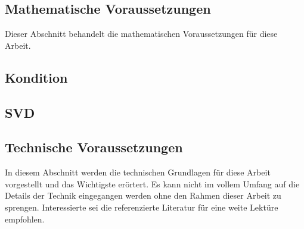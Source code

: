 \subsection[mathematisches]{Mathematische Voraussetzungen}
%
Dieser Abschnitt behandelt die mathematischen Voraussetzungen für diese Arbeit.
%
\subsection{Kondition}

%
\subsection{SVD}

%
\subsection[technisches]{Technische Voraussetzungen}
%
In diesem Abschnitt werden die technischen Grundlagen für diese Arbeit vorgestellt und das Wichtigste erörtert. Es kann nicht im vollem Umfang auf die Details der Technik eingegangen werden ohne den Rahmen dieser Arbeit zu sprengen. Interessierte sei die referenzierte Literatur für eine weite Lektüre empfohlen.
%
